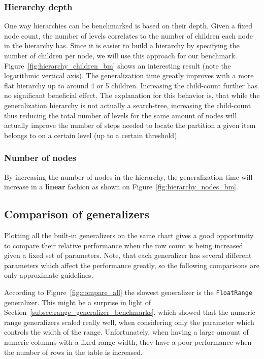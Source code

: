 \subsubsection{Hierarchy depth}
One way hierarchies can be benchmarked is based on their depth. Given a fixed node count, the number of levels correlates to the number of children each node in the hierarchy has. Since it is easier to build a hierarchy by specifying the number of children per node, we will use this approach for our benchmark. Figure~\ref{fig:hierarchy_children_bm} shows an interesting result (note the logarithmic vertical axis). The generalization time greatly improves with a more flat hierarchy up to around 4 or 5 children. Increasing the child-count further has no significant beneficial effect. The explanation for this behavior is, that while the generalization hierarchy is not actually a search-tree, increasing the child-count thus reducing the total number of levels for the same amount of nodes will actually improve the number of steps needed to locate the partition a given item belongs to on a certain level (up to a certain threshold).
\vspace{\baselineskip}


\subsubsection{Number of nodes}
By increasing the number of nodes in the hierarchy, the generalization time will increase in a \textbf{linear} fashion as shown on Figure~\ref{fig:hierarchy_nodes_bm}.
\vspace{\baselineskip}


\subsection{Comparison of generalizers}

Plotting all the built-in generalizers on the same chart gives a good opportunity to compare their relative performance when the row count is being increased given a fixed set of parameters. Note, that each generalizer has several different parameters which affect the performance greatly, so the following comparisons are only approximate guidelines.

According to Figure~\ref{fig:compare_all} the slowest generalizer is the \texttt{FloatRange} generalizer. This might be a surprise in light of Section~\ref{subsec:range_generalizer_benchmarks}, which showed that the numeric range generalizers scaled really well, when considering only the parameter which controls the width of the range. Unfortunately, when having a large amount of numeric columns with a fixed range width, they have a poor performance when the number of rows in the table is increased. 

